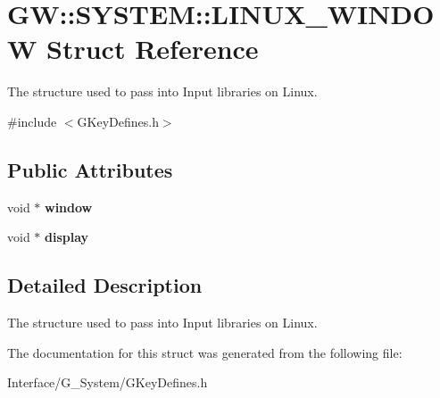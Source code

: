 \hypertarget{structGW_1_1SYSTEM_1_1LINUX__WINDOW}{}\section{GW\+:\+:S\+Y\+S\+T\+EM\+:\+:L\+I\+N\+U\+X\+\_\+\+W\+I\+N\+D\+OW Struct Reference}
\label{structGW_1_1SYSTEM_1_1LINUX__WINDOW}


The structure used to pass into Input libraries on Linux.  




{\ttfamily \#include $<$G\+Key\+Defines.\+h$>$}

\subsection*{Public Attributes}
\begin{DoxyCompactItemize}
\item 
\mbox{\label{structGW_1_1SYSTEM_1_1LINUX__WINDOW_a9d4ffe1d048716af5f2d1fe3595b6b99}} 
void $\ast$ {\bfseries window}
\item 
\mbox{\label{structGW_1_1SYSTEM_1_1LINUX__WINDOW_ae68b93065e8ebd9de010f42ccf688ac5}} 
void $\ast$ {\bfseries display}
\end{DoxyCompactItemize}


\subsection{Detailed Description}
The structure used to pass into Input libraries on Linux. 

The documentation for this struct was generated from the following file\+:\begin{DoxyCompactItemize}
\item 
Interface/\+G\+\_\+\+System/G\+Key\+Defines.\+h\end{DoxyCompactItemize}
